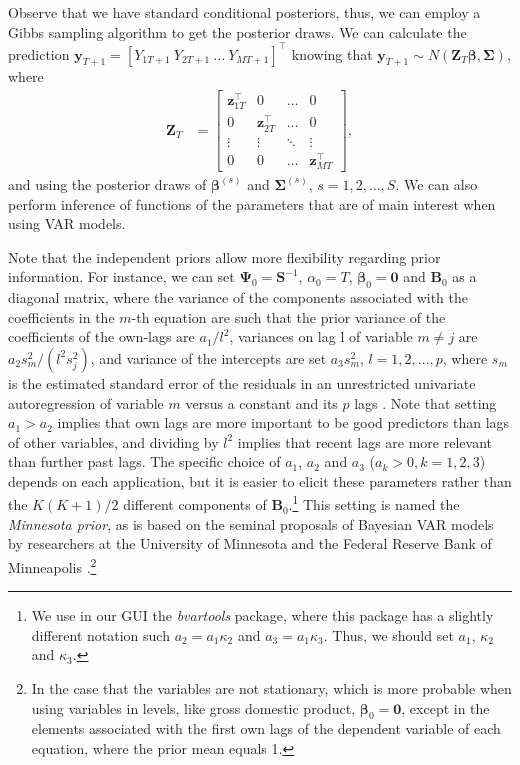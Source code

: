 Observe that we have standard conditional posteriors, thus, we can employ a Gibbs sampling algorithm to get the posterior draws. We can calculate the prediction $\bm{y}_{T+1}=[Y_{1T+1} \ Y_{2T+1} \ \dots \ Y_{MT+1}]^{\top}$ knowing that $\bm{y}_{T+1}\sim N(\bm{Z}_{T}\bm{\beta},\bm{\Sigma})$, where \begin{align*}
	\bm{Z}_T&=\begin{bmatrix}
		\bm{z}_{1T}^{\top} & 0 & \dots & 0\\
		0 & \bm{z}_{2T}^{\top} & \dots & 0\\
		\vdots & \vdots & \ddots & \vdots\\
		0 & 0& \dots & \bm{z}_{MT}^{\top}		
	\end{bmatrix},
\end{align*} 
and using the posterior draws of $\bm{\beta}^{(s)}$ and $\bm{\Sigma}^{(s)}$, $s=1,2,\dots,S$. We can also perform inference of functions of the parameters that are of main interest when using VAR models.

Note that the independent priors allow more flexibility regarding prior information. For instance, we can set $\bm{\Psi}_0 = \bm{S}^{-1}$, $\alpha_0=T$, $\bm{\beta}_0=\bm{0}$ and $\bm{B}_0$ as a diagonal matrix, where the variance of the components associated with the coefficients in the $m$-th equation are such that the prior variance of the coefficients of the own-lags are $a_1/l^2$, variances on lag l of variable $m\neq j$ are $a_2s_{m}^2/(l^2s_{j}^2)$, and variance of the intercepts are set $a_3s_{m}^2$, $l=1,2,\dots,p$, where $s_{m}$ is the estimated standard error of the residuals in an unrestricted univariate autoregression of variable $m$ versus a constant and its $p$ lags \cite{litterman1986forecasting,koop2010bayesian}. Note that setting $a_1>a_2$ implies that own lags are more important to be good predictors than lags of other variables, and dividing by $l^2$ implies that recent lags are more relevant than further past lags. The specific choice of $a_1$, $a_2$ and $a_3$ ($a_k>0,k=1,2,3$) depends on each application, but it is easier to elicit these parameters rather than the $K(K+1)/2$ different components of $\bm{B}_0$.\footnote{We use in our GUI the \textit{bvartools} package, where this package has a slightly different notation such $a_2=a_1\kappa_2$ and $a_3=a_1\kappa_3$. Thus, we should set $a_1$, $\kappa_2$ and $\kappa_3$.} This setting is named the \textit{Minnesota prior}, as is based on the seminal proposals of Bayesian VAR models by researchers at the University of Minnesota and the Federal Reserve Bank of Minneapolis \cite{doan1984forecasting,litterman1986forecasting}.\footnote{In the case that the variables are not stationary, which is more probable when using variables in levels, like gross domestic product, $\bm{\beta}_0=\bm{0}$, except in the elements associated with the first own lags of the dependent variable of each equation, where the prior mean equals 1.} 

